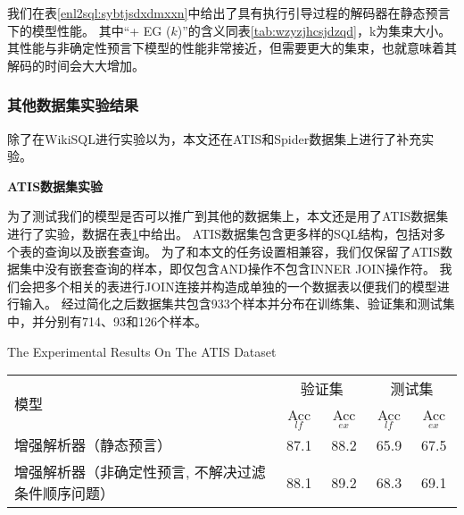 我们在表\ref{enl2sql:sybtjsdxdmxxn}中给出了具有执行引导过程的解码器在静态预言下的模型性能。
其中“+ EG ($k$)”的含义同表\ref{tab:wzyzjhcsjdzqd}，k为集束大小。
其性能与非确定性预言下模型的性能非常接近，但需要更大的集束，也就意味着其解码的时间会大大增加。



\subsubsection{其他数据集实验结果}

除了在WikiSQL进行实验以为，本文还在ATIS\cite{Dahl1994Expanding}和Spider数据集\cite{yu2018spider}上进行了补充实验。

\textbf{ATIS数据集实验}

为了测试我们的模型是否可以推广到其他的数据集上，本文还是用了ATIS数据集进行了实验，数据在表\ref{tab:asjjsdsyjg}中给出。
ATIS数据集包含更多样的SQL结构，包括对多个表的查询以及嵌套查询。
为了和本文的任务设置相兼容，我们仅保留了ATIS数据集中没有嵌套查询的样本，即仅包含AND操作不包含INNER JOIN操作符。
我们会把多个相关的表进行JOIN连接并构造成单独的一个数据表以便我们的模型进行输入。
经过简化之后数据集共包含933个样本并分布在训练集、验证集和测试集中，并分别有714、93和126个样本。

\begin{table}[!htpb]
    {The Experimental Results On The ATIS Dataset}
  \label{tab:asjjsdsyjg}
  \centering
  \begin{threeparttable}[b]
     \begin{tabular}{lcccc}
      \toprule
      \multirow{2}{10mm}{模型}&\multicolumn{2}{c}{验证集} & \multicolumn{2}{c}{测试集}\\
      \cmidrule(lr){2-3}\cmidrule(lr){4-5}
      & Acc$_{lf}$ & Acc$_{ex}$ & Acc$_{lf}$ & Acc$_{ex}$\\
      \midrule
      增强解析器（静态预言） & 87.1 & 88.2 & 65.9 & 67.5\\
      增强解析器（非确定性预言, 不解决过滤条件顺序问题） & 88.1 & 89.2 & 68.3 & 69.1\\
      \bottomrule
    \end{tabular}
  \end{threeparttable}
\end{table}

